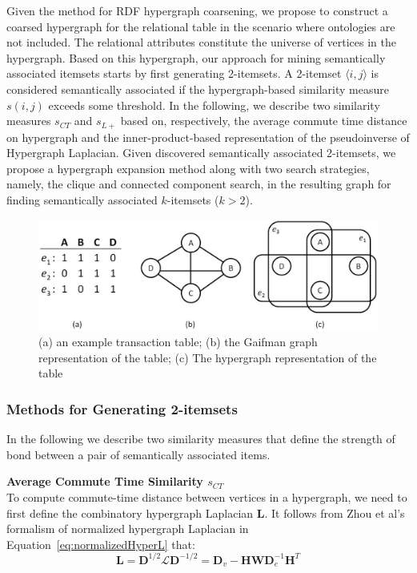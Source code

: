 Given the method for RDF hypergraph coarsening, we propose to construct a coarsed hypergraph for the relational table in the scenario where ontologies are not included. The relational attributes constitute the universe of vertices in the hypergraph. Based on this hypergraph, our approach for mining semantically associated itemsets starts by first generating 2-itemsets. A 2-itemset $\langle i,j \rangle$ is considered semantically associated if the hypergraph-based similarity measure $s(i,j)$ exceeds some threshold. In the following, we describe two similarity measures $s_{CT}$ and $s_{L+}$ based on, respectively, the average commute time distance on hypergraph and the inner-product-based representation of the pseudoinverse of Hypergraph Laplacian. Given discovered semantically associated 2-itemsets, we propose a hypergraph expansion method along with two search strategies, namely, the clique and connected component search, in the resulting graph for finding semantically associated $k$-itemsets ($k>2$).
\begin{figure}[tbh]
\begin{center}
\includegraphics[width=.8\textwidth]{fig/hg_and_rg1.eps}
\end{center}
\caption[The simple graph vs. hypergraph for representing a relational table.]{\label{fig:hg_and_rg} (a) an example transaction table; (b) the Gaifman graph representation of the table; (c) The hypergraph representation of the table}
\end{figure}

\subsubsection{Methods for Generating 2-itemsets}
In the following we describe two similarity measures that define the strength of bond between a pair of semantically associated items.

\textbf{Average Commute Time Similarity $s_{CT}$}\\
To compute commute-time distance between vertices in a hypergraph, we need to first define the combinatory hypergraph Laplacian $\mathbf{L}$.
It follows from Zhou et al's formalism of normalized hypergraph Laplacian in Equation~\ref{eq:normalizedHyperL} that:
\begin{equation}
\mathbf{L}=\mathbf{D}^{1/2}\mathcal{L}\mathbf{D}^{-1/2}=\mathbf{D}_v-\mathbf{HWD}_e^{-1}\mathbf{H}^T \label{eq:combinatoryHyperL}
\end{equation}

